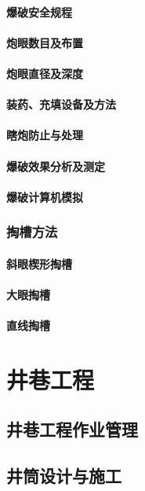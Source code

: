 \documentclass[UTF8]{../../ApplicationUniverse}
\begin{document}
            \paragraph{爆破安全规程}
            \paragraph{炮眼数目及布置}
            \paragraph{炮眼直径及深度}
            \paragraph{装药、充填设备及方法}
            \paragraph{瞎炮防止与处理}
            \paragraph{爆破效果分析及测定}
            \paragraph{爆破计算机模拟}
        \subsubsection{掏槽方法}
            \paragraph{斜眼楔形掏槽}
            \paragraph{大眼掏槽}
            \paragraph{直线掏槽}
\section{井巷工程}
    \subsection{井巷工程作业管理}
    \subsection{井筒设计与施工}
\end{document}
